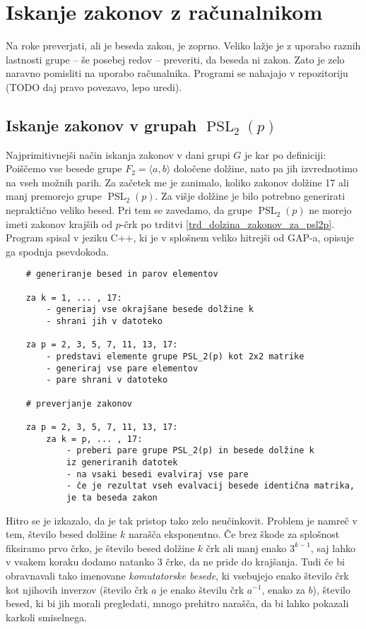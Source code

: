 \section{Iskanje zakonov z računalnikom}

Na roke preverjati, ali je beseda zakon, je zoprno. Veliko lažje je z uporabo raznih lastnosti grupe -- še posebej redov -- preveriti, da beseda ni zakon. 
Zato je zelo naravno pomisliti na uporabo računalnika. %
Programi se nahajajo v repozitoriju (TODO daj pravo povezavo, lepo uredi).

\subsection{Iskanje zakonov v grupah $\operatorname{PSL}_2(p)$} %

Najprimitivnejši način iskanja zakonov v dani grupi $G$ je kar po definiciji: Poiščemo vse besede grupe $F_2 = \langle a,b \rangle$ določene dolžine, nato pa jih izvrednotimo na vseh možnih parih.
Za začetek me je zanimalo, koliko zakonov dolžine 17 ali manj premorejo grupe $\operatorname{PSL}_2(p)$. Za višje dolžine je bilo potrebno generirati nepraktično veliko besed. Pri tem se zavedamo, da grupe $\operatorname{PSL}_2(p)$ ne morejo imeti zakonov krajših od $p$-črk po trditvi \ref{trd_dolzina_zakonov_za_psl2p}.
Program spisal v jeziku C++, ki je v splošnem veliko hitrejši od GAP-a, opisuje ga spodnja psevdokoda.

\begin{verbatim}
    # generiranje besed in parov elementov

    za k = 1, ... , 17:
        - generiaj vse okrajšane besede dolžine k
        - shrani jih v datoteko
    
    za p = 2, 3, 5, 7, 11, 13, 17:
        - predstavi elemente grupe PSL_2(p) kot 2x2 matrike
        - generiraj vse pare elementov
        - pare shrani v datoteko

    # preverjanje zakonov
    
    za p = 2, 3, 5, 7, 11, 13, 17:
        za k = p, ... , 17:
            - preberi pare grupe PSL_2(p) in besede dolžine k 
            iz generiranih datotek
            - na vsaki besedi evalviraj vse pare
            - če je rezultat vseh evalvacij besede identična matrika,
            je ta beseda zakon
\end{verbatim}

Hitro se je izkazalo, da je tak pristop tako zelo neučinkovit. Problem je namreč v tem, število besed dolžine $k$ narašča eksponentno. Če brez škode za splošnost fiksiramo prvo črko, je število besed dolžine $k$ črk ali manj enako $3^{k - 1}$,
saj lahko v vsakem koraku dodamo natanko 3 črke, da ne pride do krajšanja. Tudi če bi obravnavali tako imenovane \emph{komutatorske besede}, ki vsebujejo enako število črk kot njihovih inverzov (število črk $a$ je enako številu črk $a^{-1}$, enako za $b$),
število besed, ki bi jih morali pregledati, mnogo prehitro narašča, da bi lahko pokazali karkoli smiselnega.

